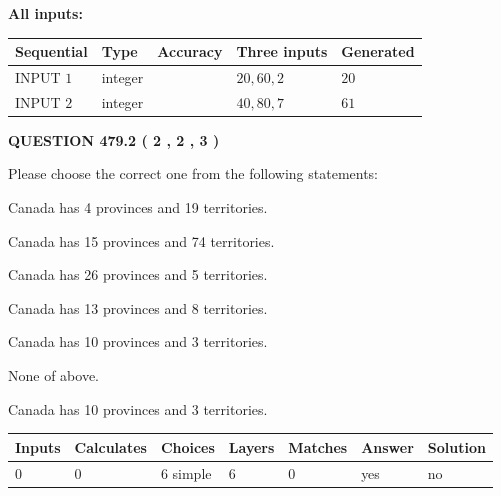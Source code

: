 \documentclass[12pt]{article}
\begin{document}
   
   
   
\noindent\vspace{0.1in}\hspace{-0.08in} {\textbf{\Large{All inputs: }}}
   
   
  
  
\noindent\begin{tabular}{|l|l|l|l|l|}
\hline
 Sequential & Type & Accuracy & Three inputs & Generated \\ 
\hline
 
 
  INPUT $  1 $ & integer &  & $
 20
 , 
 60
 , 
 2
 $ & $ 20 $ 
 \\  \hline  
 
 
  INPUT $  2 $ & integer &  & $
 40
 , 
 80
 , 
 7
 $ & $ 61 $ 
 \\  \hline  
 \end{tabular}
   
   
  
\vspace{0.2in}
  
{\textbf{\Large{QUESTION
479.2 
 ( 2 , 2 , 3 )
}}}
  
  
Please choose the correct one from the following statements:
 
 
Canada has   4 provinces and  19 territories.
 
 
Canada has  15 provinces and  74 territories.
 
 
Canada has  26 provinces and  5 territories.
 
 
Canada has  13 provinces and  8 territories.
 
 
Canada has 10  provinces and 3 territories.
 
 
 None of above.
 
 
\noindent{}
 
 
Canada has 10  provinces and 3 territories.
 
 
\noindent{}
 
 
   
   
   
   
\noindent\begin{tabular}{|l|l|l|l|l|l|l|}
 \hline
Inputs & Calculates & Choices & Layers & Matches & Answer & Solution \\ \hline
 0  & 
 0  & 
 6
  simple  
  & 
 6  & 
 0  & 
  yes & 
  no 
  \\ \hline
 \end{tabular}
   
\end{document}
